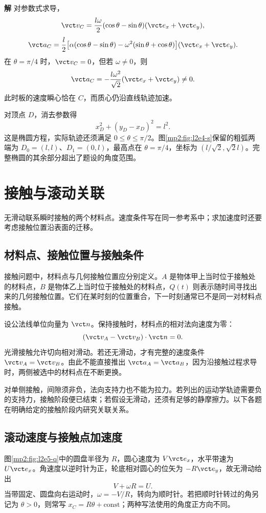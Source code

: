 \documentclass[11pt,openany,fontset=fandol]{ctexbook}
\theoremstyle{definition}\newtheorem{example}{例}[chapter]\newtheorem{exercise}{习题}[chapter]
\newcommand{\SolutionStart}{\par\medskip\ifdim\pagetotal>0pt\ifdim\dimexpr\pagegoal-\pagetotal\relax<3\baselineskip\newpage\fi\fi\noindent\textbf{解}\quad\ignorespaces}
\newenvironment{solution}{\SolutionStart}{\par\medskip}
\begin{document}
\begin{solution}
对参数式求导，
\[
\vct v_C=\frac{l\omega}{2}(\cos\theta-\sin\theta)(\vct e_x+\vct e_y),
\]
\[
\vct a_C=\frac l2\bigl[\alpha(\cos\theta-\sin\theta)
-\omega^2(\sin\theta+\cos\theta)\bigr](\vct e_x+\vct e_y).
\]
在 $\theta=\pi/4$ 时，$\vct v_C=0$，但若 $\omega\ne0$，则
\[
\vct a_C=-\frac{l\omega^2}{\sqrt2}(\vct e_x+\vct e_y)\ne0.
\]
此时板的速度瞬心恰在 $C$，而质心仍沿直线轨迹加速。

对顶点 $D$，消去参数得
\[
x_D^2+(y_D-x_D)^2=l^2.
\]
这是椭圆方程，实际轨迹还须满足 $0\le\theta\le\pi/2$。图\ref{mp2:fig:l2e4-s}保留的粗弧两端为 $D_0=(l,l)$、$D_1=(0,l)$，最高点在 $\theta=\pi/4$，坐标为 $(l/\sqrt2,\sqrt2l)$。完整椭圆的其余部分超出了题设的角度范围。

\end{solution}











\section{接触与滚动关联}
无滑动联系瞬时接触的两个材料点。速度条件写在同一参考系中；求加速度时还要考虑接触位置沿表面的迁移。

\subsection{材料点、接触位置与接触条件}
接触问题中，材料点与几何接触位置应分别定义。$A$ 是物体甲上当时位于接触处的材料点，$B$ 是物体乙上当时位于接触处的材料点，$Q(t)$ 则表示随时间寻找出来的几何接触位置。它们在某时刻的位置重合，下一时刻通常已不是同一对材料点接触。

设公法线单位向量为 $\vct n$。保持接触时，材料点的相对法向速度为零：
\[
(\vct v_A-\vct v_B)\cdot\vct n=0.
\]
光滑接触允许切向相对滑动。若还无滑动，才有完整的速度条件 $\vct v_A=\vct v_B$。由此不能直接推出 $\vct a_A=\vct a_B$，因为沿接触过程求导时，两侧被选中的材料点在不断更换。

对单侧接触，间隙须非负，法向支持力也不能为拉力。若列出的运动学轨迹需要负的支持力，接触阶段便已结束；若假设无滑动，还须有足够的静摩擦力。以下各题在明确给定的接触阶段内研究关联关系。

\subsection{滚动速度与接触点加速度}
图\ref{mp2:fig:l2e5-q}中的圆盘半径为 $R$，圆心速度为 $V\vct e_x$，水平带速为 $U\vct e_x$。角速度以逆时针为正，轮底相对圆心的位矢为 $-R\vct e_y$，故无滑动给出
\[
V+\omega R=U.
\]
当带固定、圆盘向右运动时，$\omega=-V/R$，转向为顺时针。若把顺时针转过的角另记为 $\theta>0$，则常写 $x_C=R\theta+\mathrm{const}$；两种写法使用的角度正方向不同。
\end{document}
